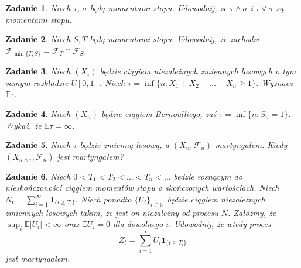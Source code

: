 \documentclass{mwart}
\newtheorem{zd}{Zadanie}
\begin{document}
\begin{zd}
Niech $\tau$, $\sigma$ będą momentami stopu. Udowodnij, że $\tau \land \sigma$ i $\tau \lor \sigma$ są momentami stopu.
\end{zd}


\begin{zd}
	Niech $S, T$ będą momentami stopu. Udowodnij, że zachodzi $\mathcal{F}_{\min\{T,S\}} = \mathcal{F}_{T} \cap \mathcal{F}_{S}$.
\end{zd}
\begin{zd}
Niech $(X_i)$ będzie ciągiem niezależnych zmiennych losowych o tym samym rozkładzie $U[0, 1]$. Niech $\tau = \inf\{n\colon X_1 + X_2 + \dots + X_n \geq 1\}$. Wyznacz $\mathbb{E}\tau$.
\end{zd}

\begin{zd}
Niech $(X_n)$ będzie ciągiem Bernoulliego, zaś $\tau = \inf\{n\colon S_n=1\}$. Wykaż, że $\mathbb{E}\tau = \infty$.
\end{zd}

\begin{zd}
Niech $\tau$ będzie zmienną losową, a $(X_n, \mathcal{F}_n)$ martyngałem. Kiedy $(X_{n\wedge \tau}, \mathcal{F}_n)$ jest martyngałem?
\end{zd}

\begin{zd}
	Niech $0 < T_1 < T_2 < \dots < T_n < \dots $ będzie rosnącym do nieskończoności ciągiem momentów stopu o skończonych wartościach. Niech $N_t = \sum_{i = 1}^{\infty}\pmb{1}_{\{i \geq T_i\}}.$ Niech ponadto $\{U_i\}_{i \in \mathbb{N}}$ będzie ciągiem niezależnych zmiennych losowych takim, że jest on niezależny od procesu $N$. Załóżmy, że $\sup_i\mathbb{E}|U_i|< \infty$ oraz $\mathbb{E}U_i = 0$ dla dowolnego $i$. Udowodnij, że wtedy proces
	\begin{displaymath}
		Z_t = \sum_{i = 1}^{\infty}U_i\pmb{1}_{\{t \geq T_i\}}
	\end{displaymath}
	jest martyngałem.
\end{zd}
\end{document}
